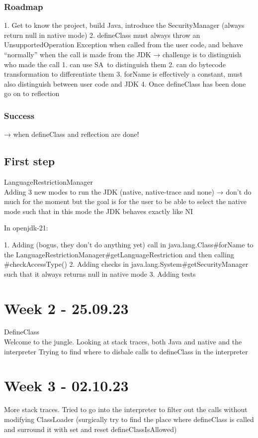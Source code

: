 \subsubsection{Roadmap}
1. Get to know the project, build Java, introduce the SecurityManager (always return null in native mode)
2. defineClass must always throw an UnsupportedOperation Exception when called from the user code, and behave “normally” when the call is made from the JDK → challenge is to distinguish who made the call
    1. can use SA to distinguish them
    2. can do bytecode transformation to differentiate them
3. forName is effectively a constant, must also distinguish between user code and JDK
4. Once defineClass has been done go on to reflection

\subsubsection{Success}
→ when defineClass and reflection are done!

\subsection{First step}
LanguageRestrictionManager \\
Adding 3 new modes to run the JDK (native, native-trace and none) → don’t do much for the moment but the goal is for the user to be able to select the native mode such that in this mode the JDK behaves exactly like NI

In openjdk-21:

1. Adding (bogus, they don’t do anything yet) call in java.lang.Class\#forName to the LanguageRestrictionManager\#getLanguageRestriction and then calling \#checkAccessType()
2. Adding checks in java.lang.System\#getSecurityManager such that it always returns null in native mode
3. Adding tests
\section{Week 2 - 25.09.23}
DefineClass \\
Welcome to the jungle. Looking at stack traces, both Java and native and the interpreter
Trying to find where to disbale calls to defineClass in the interpreter
\section{Week 3 - 02.10.23}
More stack traces. Tried to go into the interpreter to filter out the calls without modifying ClassLoader (surgically try to find the place where defineClass is called and surround it with set and reset defineClassIsAllowed)
